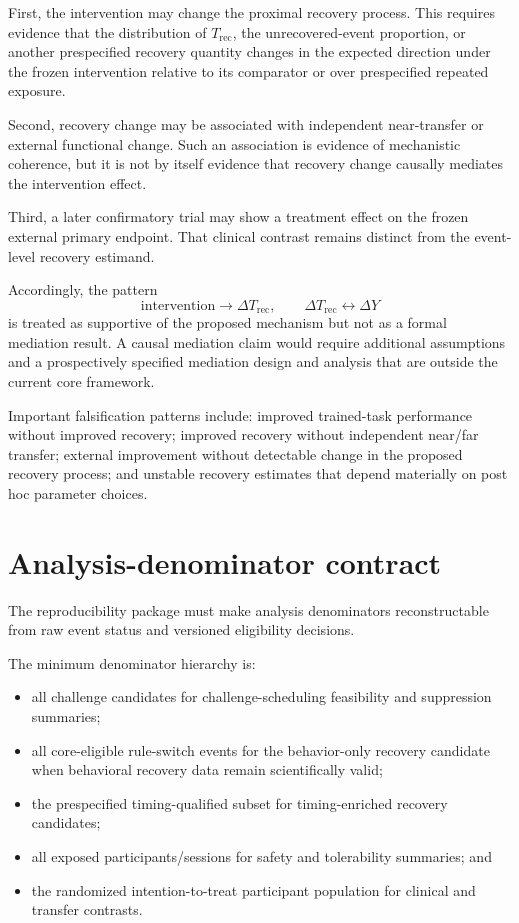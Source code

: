\documentclass[man]{apa7}
\begin{document}
First, the intervention may change the proximal recovery process. This requires evidence that the distribution of \(T_{\mathrm{rec}}\), the unrecovered-event proportion, or another prespecified recovery quantity changes in the expected direction under the frozen intervention relative to its comparator or over prespecified repeated exposure.

Second, recovery change may be associated with independent near-transfer or external functional change. Such an association is evidence of mechanistic coherence, but it is not by itself evidence that recovery change causally mediates the intervention effect.

Third, a later confirmatory trial may show a treatment effect on the frozen external primary endpoint. That clinical contrast remains distinct from the event-level recovery estimand.

Accordingly, the pattern
\[
\text{intervention}\rightarrow \Delta T_{\mathrm{rec}},
\qquad
\Delta T_{\mathrm{rec}} \leftrightarrow \Delta Y
\]
is treated as supportive of the proposed mechanism but not as a formal mediation result. A causal mediation claim would require additional assumptions and a prospectively specified mediation design and analysis that are outside the current core framework.

Important falsification patterns include: improved trained-task performance without improved recovery; improved recovery without independent near/far transfer; external improvement without detectable change in the proposed recovery process; and unstable recovery estimates that depend materially on post hoc parameter choices.

\section{Analysis-denominator contract}

The reproducibility package must make analysis denominators reconstructable from raw event status and versioned eligibility decisions.

The minimum denominator hierarchy is:

\begin{itemize}
\item all challenge candidates for challenge-scheduling feasibility and suppression summaries;
\item all core-eligible rule-switch events for the behavior-only recovery candidate when behavioral recovery data remain scientifically valid;
\item the prespecified timing-qualified subset for timing-enriched recovery candidates;
\item all exposed participants/sessions for safety and tolerability summaries; and
\item the randomized intention-to-treat participant population for clinical and transfer contrasts.
\end{itemize}
\end{document}
